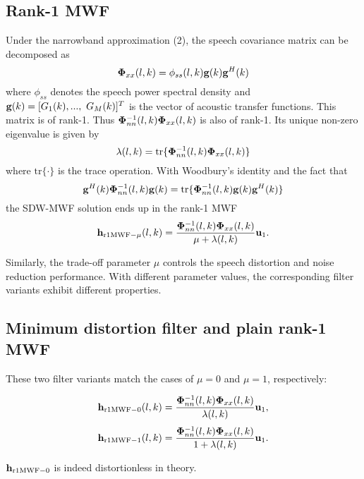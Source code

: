 \documentclass[review]{elsarticle}
\newif\ifproofread
\newcommand{\pfmarker}[1]{%
\ifproofread
\textcolor{red}{#1}%
\else
#1%
\fi
}
\begin{document}
\pfmarker{\subsection{Rank-1 MWF}}

Under the narrowband approximation (2), the speech covariance matrix can be decomposed as
\begin{equation}\label{eq:phix}
  {\bf \Phi}_{xx}\pfmarker{(l,k)}=\phi_{ss}\pfmarker{(l,k)}{\bf g}\pfmarker{(k)}{\bf g}^H\pfmarker{(k)}
\end{equation}
where $\phi_{ss}$ denotes the speech power spectral density and ${\bf g}(k)=[G_1(k),...,~G_M(k)]^T$ is the vector of acoustic transfer functions. This matrix is of rank-1. Thus ${\bf \Phi}_{nn}^{-1}(l,k){\bf \Phi}_{xx}(l,k)$ is also of rank-1. Its unique non-zero eigenvalue is given by
\begin{equation}\label{eq:lamda}
  \lambda\pfmarker{(l,k)}={\text{tr}} \{ {\bf \Phi}_{nn}^{-1}\pfmarker{(l,k)}{\bf \Phi}_{xx}\pfmarker{(l,k)} \}
\end{equation}
where  ${\text{tr}}\{\cdot \}$ is the trace operation. With Woodbury's identity and the fact that
\begin{equation}\label{eq:tr}
  {\bf g}^H\pfmarker{(k)}{\bf \Phi}_{nn}^{-1}\pfmarker{(l,k)}{\bf g}\pfmarker{(k)}= {\text{tr}}\{{\bf \Phi}_{nn}^{-1}\pfmarker{(l,k)}{\bf g}\pfmarker{(k)}{\bf g}^H\pfmarker{(k)} \}
\end{equation}
the SDW-MWF solution ends up in the rank-1 MWF
\begin{equation}\label{eq:r1mwf}
{\bf h}_{\text{r1MWF}-\mu}\pfmarker{(l,k)}=\frac{{\bf \Phi}_{nn}^{-1}\pfmarker{(l,k)}{\bf \Phi}_{xx}\pfmarker{(l,k)}}{\mu+\lambda\pfmarker{(l,k)}}{\bf u}_{1}.
\end{equation}
\pfmarker{Similarly, the trade-off parameter $\mu$ controls the speech distortion and noise reduction performance. With different parameter values, the corresponding filter variants exhibit different properties.}

\pfmarker{\subsection{Minimum distortion filter and plain rank-1 MWF}}

\pfmarker{These two filter variants match the cases of $\mu=0$ and $\mu=1$, respectively:}
\begin{equation}\label{eq:hdistless}
  {\bf h}_{\text{r1MWF}-0}\pfmarker{(l,k)}=\frac{{\bf \Phi}_{nn}^{-1}\pfmarker{(l,k)}{\bf \Phi}_{xx}\pfmarker{(l,k)}}{\lambda\pfmarker{(l,k)}}{\bf u}_{1},
\end{equation}
\begin{equation}\label{eq:hwiener}
  {\bf h}_{\text{r1MWF}-1}\pfmarker{(l,k)}=\frac{{\bf \Phi}_{nn}^{-1}\pfmarker{(l,k)}{\bf \Phi}_{xx}\pfmarker{(l,k)}}{1+\lambda\pfmarker{(l,k)}}{\bf u}_{1}.
\end{equation}
\pfmarker{${\bf h}_{\text{r1MWF}-0}$ is indeed distortionless in theory.}
\end{document}
